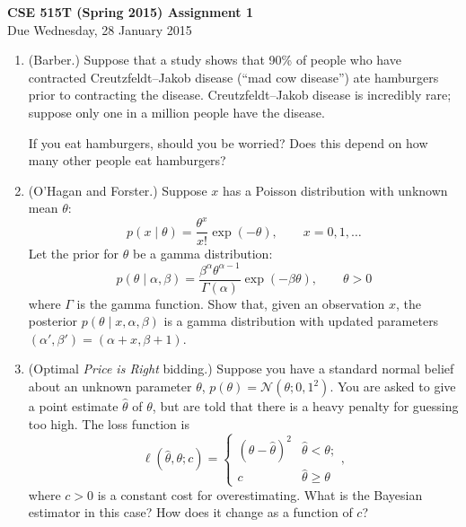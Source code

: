 \documentclass{article}
\newcommand{\given}{\mid}
\newcommand{\mc}[1]{\mathcal{#1}}
\begin{document}
{\large \textbf{CSE 515T (Spring 2015) Assignment 1}} \\
Due Wednesday, 28 January 2015 \\

\begin{enumerate}

\item
  (Barber.)
  Suppose that a study shows that 90\% of people who have contracted
  Creutzfeldt--Jakob disease (``mad cow disease'') ate hamburgers
  prior to contracting the disease.  Creutzfeldt--Jakob disease is
  incredibly rare; suppose only one in a million people have the
  disease.

  If you eat hamburgers, should you be worried?  Does this depend on
  how many other people eat hamburgers?

\item
  (O'Hagan and Forster.)
  Suppose $x$ has a Poisson distribution with unknown mean
  $\theta$:
  \begin{equation*}
    p(x \given \theta) = \frac{\theta^x}{x!} \exp(-\theta),
    \qquad
    x = 0, 1, \dotsc
  \end{equation*}
  Let the prior for $\theta$ be a gamma distribution:
  \begin{equation*}
    p(\theta \given \alpha, \beta)
    =
    \frac{\beta^\alpha \theta^{\alpha - 1}}{\Gamma(\alpha)} \exp(-\beta\theta),
    \qquad \theta > 0
  \end{equation*}
  where $\Gamma$ is the gamma function.  Show that, given an
  observation $x$, the posterior $p(\theta \given x, \alpha, \beta)$
  is a gamma distribution with updated parameters $(\alpha', \beta') =
  (\alpha + x, \beta + 1)$.

\item
  (Optimal \emph{Price is Right} bidding.)
  Suppose you have a standard normal belief about an unknown parameter
  $\theta$, $p(\theta) = \mc{N}(\theta; 0, 1^2)$.  You are asked to
  give a point estimate $\hat{\theta}$ of $\theta$, but are told that
  there is a heavy penalty for guessing too high.  The loss function is
  \begin{equation*}
    \ell(\hat{\theta}, \theta; c)
    =
    \begin{cases}
      (\theta - \hat{\theta})^2 & \hat{\theta}  <   \theta; \\
      c                         & \hat{\theta} \geq \theta
    \end{cases},
  \end{equation*}
  where $c > 0$ is a constant cost for overestimating.  What is the
  Bayesian estimator in this case?  How does it change as a function
  of $c$?


\end{enumerate}
\end{document}

